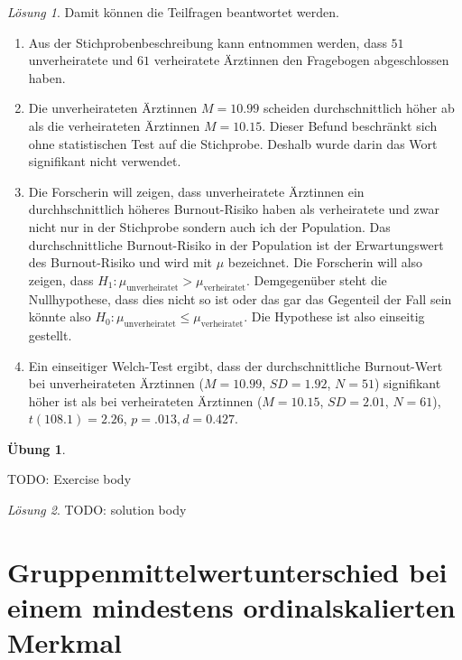 \documentclass[
]{book}
\providecommand{\tightlist}{%
  \setlength{\itemsep}{0pt}\setlength{\parskip}{0pt}}
\theoremstyle{definition}
\theoremstyle{definition}
\theoremstyle{definition}
\newtheorem{exercise}{Übung}[chapter]
\theoremstyle{definition}
\theoremstyle{remark}
\newtheorem*{solution}{Lösung}
\begin{document}
\begin{solution}
Damit können die Teilfragen beantwortet werden.

\begin{enumerate}
\def\labelenumi{\alph{enumi})}
\tightlist
\item
  Aus der Stichprobenbeschreibung kann entnommen werden, dass \(51\) unverheiratete und \(61\) verheiratete Ärztinnen den Fragebogen abgeschlossen haben.
\item
  Die unverheirateten Ärztinnen \(M = 10.99\) scheiden durchschnittlich höher ab als die verheirateten Ärztinnen \(M = 10.15\). Dieser Befund beschränkt sich ohne statistischen Test auf die Stichprobe. Deshalb wurde darin das Wort signifikant nicht verwendet.
\item
  Die Forscherin will zeigen, dass unverheiratete Ärztinnen ein durchhschnittlich höheres Burnout-Risiko haben als verheiratete und zwar nicht nur in der Stichprobe sondern auch ich der Population. Das durchschnittliche Burnout-Risiko in der Population ist der Erwartungswert des Burnout-Risiko und wird mit \(\mu\) bezeichnet. Die Forscherin will also zeigen, dass \(H_1: \mu_\text{unverheiratet} > \mu_\text{verheiratet}\). Demgegenüber steht die Nullhypothese, dass dies nicht so ist oder das gar das Gegenteil der Fall sein könnte also \(H_0: \mu_\text{unverheiratet} \leq \mu_\text{verheiratet}\). Die Hypothese ist also einseitig gestellt.
\item
  Ein einseitiger Welch-Test ergibt, dass der durchschnittliche Burnout-Wert bei unverheirateten Ärztinnen (\(M = 10.99\), \(SD = 1.92\), \(N = 51\)) signifikant höher ist als bei verheirateten Ärztinnen (\(M = 10.15\), \(SD = 2.01\), \(N = 61\)), \(t(108.1) = 2.26\), \(p = .013, d = 0.427\).
\end{enumerate}

\end{solution}

\begin{exercise}
\protect\hypertarget{exr:tagname5}{}\label{exr:tagname5}\leavevmode

TODO: Exercise body

\end{exercise}

\begin{solution}
TODO: solution body
\end{solution}

\chapter{Gruppenmittelwertunterschied bei einem mindestens ordinalskalierten Merkmal}\label{gruppenmittelwertunterschied-bei-einem-mindestens-ordinalskalierten-merkmal}
\end{document}
